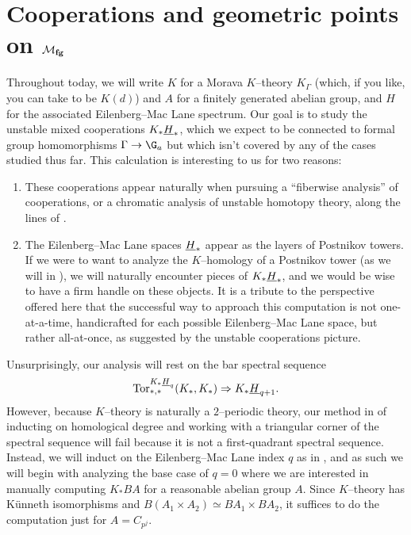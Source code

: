 \section{Cooperations and geometric points on \texorpdfstring{$\mathcal{M}_{\mathbf{fg}}$}{Mfg}}\label{CoopnsForMoravaKandHA}

Throughout today, we will write $K$ for a Morava $K$--theory $K_\Gamma$ (which, if you like, you can take to be $K(d)$) and $A$ for a finitely generated abelian group, and $H$ for the associated Eilenberg--Mac Lane spectrum.  Our goal is to study the unstable mixed cooperations $K_* \underline{\smash{H}}_{*}$, which we expect to be connected to formal group homomorphisms $\Gamma \to \G_a$ but which isn't covered by any of the cases studied thus far.  This calculation is interesting to us for two reasons:
\begin{enumerate}
\item These cooperations appear naturally when pursuing a ``fiberwise analysis'' of cooperations, or a chromatic analysis of unstable homotopy theory, along the lines of .
\item The Eilenberg--Mac Lane spaces $\underline{\smash{H}}_{*}$ appear as the layers of Postnikov towers.  If we were to want to analyze the $K$--homology of a Postnikov tower (as we will in ), we will naturally encounter pieces of $K_* \underline{\smash{H}}_{*}$, and we would be wise to have a firm handle on these objects.  It is a tribute to the perspective offered here that the successful way to approach this computation is not one-at-a-time, handicrafted for each possible Eilenberg--Mac Lane space, but rather all-at-once, as suggested by the unstable cooperations picture.
\end{enumerate}

Unsurprisingly, our analysis will rest on the bar spectral sequence \[\operatorname{Tor}^{K_* \underline{\smash{H}}_{q}}_{*, *}(K_*, K_*) \Rightarrow K_* \underline{\smash{H}}_{q+1}.\]  However, because $K$--theory is naturally a $2$--periodic theory, our method in  of inducting on homological degree and working with a triangular corner of the spectral sequence will fail because it is not a first-quadrant spectral sequence.  Instead, we will induct on the Eilenberg--Mac Lane index $q$ as in , and as such we will begin with analyzing the base case of $q = 0$ where we are interested in manually computing $K_* BA$ for a reasonable abelian group $A$.  Since $K$--theory has K\"unneth isomorphisms and $B(A_1 \times A_2) \simeq BA_1 \times BA_2$, it suffices to do the computation just for $A = C_{p^j}$. 

